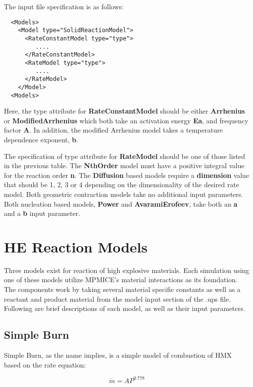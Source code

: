 The input file specification is as follows:

\begin{verbatim}
  <Models>
    <Model type="SolidReactionModel">
      <RateConstantModel type="type">
         ....
      </RateConstantModel>
      <RateModel type="type">
         ....
      </RateModel>
    </Model>
  <Models>
\end{verbatim}

\noindent Here, the type attribute for \textbf{RateConstantModel} should be either \textbf{Arrhenius} or \textbf{ModifiedArrhenius}
which both take an activation energy \textbf{Ea}, and frequency factor \textbf{A}.  In addition, the modified Arrhenius
model takes a temperature dependence exponent, \textbf{b}.

The specification of type attribute for \textbf{RateModel} should be one of those listed in the previous table.
The \textbf{NthOrder} model must have a positive integral value for the reaction order \textbf{n}. 
The \textbf{Diffusion} based models require a \textbf{dimension} value that should be 1, 2, 3 or 4 depending
on the dimensionality of the desired rate model.  Both geometric contraction models take no additional
input parameters. Both nucleation based models, \textbf{Power} and \textbf{AvaramiErofeev}, take both 
an \textbf{a} and a \textbf{b} input parameter. 

\section{HE Reaction Models}

Three models exist for reaction of high explosive materials.  Each
simulation using one of these models utilize MPMICE's material
interactions as its foundation.  The components work by taking several
material specific constants as well as a reactant and product material
from the model input section of the .ups file.  Following are brief
descriptions of each model, as well as their input parameters.

\subsection{Simple Burn} \label{Sec:SimpleBurn}

Simple Burn, as the name implies, is a simple model of combustion of HMX based on the rate equation:

\begin{equation}
\dot{m}=A P^{0.778}
\label{simburneqn}
\end{equation}

